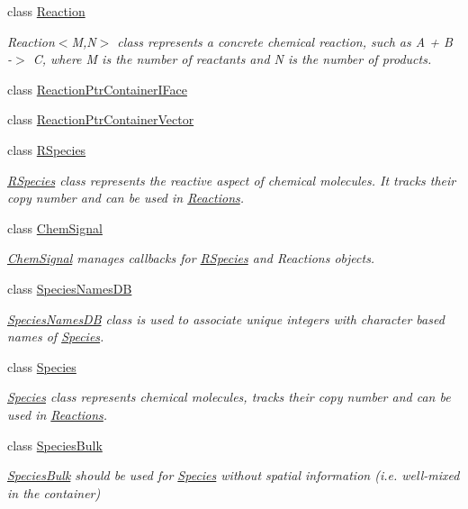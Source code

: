 \begin{DoxyCompactItemize}
class \hyperlink{classchem_1_1Reaction}{Reaction}
\begin{DoxyCompactList}\small\item\em Reaction$<$\-M,\-N$>$ class represents a concrete chemical reaction, such as A + B -\/$>$ C, where M is the number of reactants and N is the number of products. \end{DoxyCompactList}\item 
class \hyperlink{classchem_1_1ReactionPtrContainerIFace}{Reaction\-Ptr\-Container\-I\-Face}
\item 
class \hyperlink{classchem_1_1ReactionPtrContainerVector}{Reaction\-Ptr\-Container\-Vector}
\item 
class \hyperlink{classchem_1_1RSpecies}{R\-Species}
\begin{DoxyCompactList}\small\item\em \hyperlink{classchem_1_1RSpecies}{R\-Species} class represents the reactive aspect of chemical molecules. It tracks their copy number and can be used in \hyperlink{classchem_1_1Reaction}{Reactions}. \end{DoxyCompactList}\item 
class \hyperlink{classchem_1_1ChemSignal}{Chem\-Signal}
\begin{DoxyCompactList}\small\item\em \hyperlink{classchem_1_1ChemSignal}{Chem\-Signal} manages callbacks for \hyperlink{classchem_1_1RSpecies}{R\-Species} and Reactions objects. \end{DoxyCompactList}\item 
class \hyperlink{classchem_1_1SpeciesNamesDB}{Species\-Names\-D\-B}
\begin{DoxyCompactList}\small\item\em \hyperlink{classchem_1_1SpeciesNamesDB}{Species\-Names\-D\-B} class is used to associate unique integers with character based names of \hyperlink{classchem_1_1Species}{Species}. \end{DoxyCompactList}\item 
class \hyperlink{classchem_1_1Species}{Species}
\begin{DoxyCompactList}\small\item\em \hyperlink{classchem_1_1Species}{Species} class represents chemical molecules, tracks their copy number and can be used in \hyperlink{classchem_1_1Reaction}{Reactions}. \end{DoxyCompactList}\item 
class \hyperlink{classchem_1_1SpeciesBulk}{Species\-Bulk}
\begin{DoxyCompactList}\small\item\em \hyperlink{classchem_1_1SpeciesBulk}{Species\-Bulk} should be used for \hyperlink{classchem_1_1Species}{Species} without spatial information (i.\-e. well-\/mixed in the container) \end{DoxyCompactList}\item 

\end{DoxyCompactItemize}
